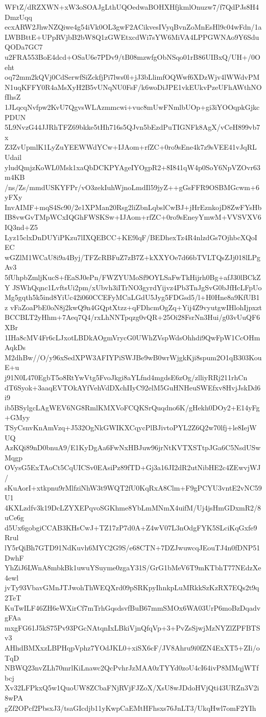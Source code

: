 WFtZ/dRZXWN+xW3oSOAJgLthUQOedwaBOHXHfjkmlOnuzw7/f7QdPJs8H4DmzUqq
ecxARW2JhwNZQiwe4g54iVk0OL3gwF2ACikvesIVyqBvnZoMnEsHl9c04wFdn/1a
LWBBttE+UPpRVjbB2bW8Q1zGWEtxcdWi7sYW6MiVA4LPPGWNAo9Y6SduQODa7GC7
u2FRA553BoE4dcd+OSaU6e7PDv9/tB08mzwfgObNSqo01rB86UIBxQ/UH+/0Oeht
oq72mm2kQVj0CdSerwfSiZckfjPi7lws0l+jJ3bLlimfOQWwf6XDzWjv4lWWdvPM
N1uqKFFY0R4aMsXyH2B5vUNqNU0FsF/k6woDiJPE1vkEUkvPzeUFhAWthNOfIhsZ
1JLqcqNvfpw2KvU7QgvsWLAzmmcwi+vuc8mUwFNmlbUOp+gi3iYOOqpkGjkcPDUN
5L9NvzG44JJRhTFZ69bkke5tHh716s5QJvn5bEzdPuTIGNFk8AgX/vCeH899vb7x
Z3ZvUpmlK1LyZuYEEWWdYCw+IJAom+rfZC+0ro9sEne4k7z9sVEE41vJqRLUdail
yludQmjzKoWL0Msk1xaQbDCKPYAgeIYOgpR2+8I841qW4p0SoY6NpVZOvr63m4KB
/ns/Zs/mmdUSKYFPr/vO3zekIuhWjnoLmdIl59jyZ++gGsFFR9OSBMGcwm+6yFXy
InvAIMF+mqS4Sc90/2e1XPMan20Rsg2liZbnLqbslCwBJ+jHrEznkojD8ZwFYsHb
IB8vwGvTMpWCxIQGhFWSKSw+IJAom+rfZC+0ro9sEneyYmwM+VVSVXV6IQ3nd+Z5
Lyz15clxDnDUYiPKzu7lIXQEBCC+KE9lqF/BEDhexTz4R4nlzdGs7OjhbcXQoIEC
wGZlM1WCaU8i9a4Byj/TFZcRBFuZ7zB7Z+kXXYOe7d66bTVLTQsZJj018lLPgAv3
5fUhpbZmljKucS+fEaSJ0ePn/FWZYUMoSf9OYLSaFwTkHijrh0Bg+afJ30lBCkZY
JSWhQqnc1LvftsUi2pm/xUbvh3iITrNO3gyrdYijvz4Pb3TnJgSvG0bJfHcLFpUo
Mg5gqth5k5ind8YiUc42i060CCEFyMCaLGdU5Jyg5FDGsd5/l+H0Hne8a9KfUB1z
vFaZoaPbE0oN8j2kwQ9n4GQptXtzz+qFDhcmOgZq+Yij4Z9vyutgwIHlohIjpxzt
BCCBLT2yHhm+7Aeq7Q4/rxLhNNTpqzg0vQR+25Oi28FsrNn3Hui/g03vUuQF6XBr
1IHa8cMV4Fr6cLJxotLBDkAOgmVrycG0UWhZVspWdsOhhdi9QwFpW1CcOHmAqkDs
M2dhBw//O/y96xSedXPW3AFIYPiSWJBe9wB0wrWjgkKji8spum2O1qB303KouE+u
j91N0L470EgbT5o8RtYwVtg5FvoJkgi8aYLfnd4mgdsE6zOg/zlliyRRj211rhCn
dT6Syok+3aaqEVTOkAYfVehVdDXchIIyC92elM5GuHNHeuSWEfxv8HvjJskDd6i9
ib5BSylgcLAgWEV6NG8RmlKMXVoFCQKSrQuqdno6K/gHekh0DOy2+E14yFg+GMyy
TSyCsnvKnAmVzq+J532OgNkGWIKXCqycPlBJivtoPYL2Z6Q2w70lfj+le8IejWUQ
AzKQi89nD0bnuA9/E1KyDgAa6FwNxHBJuw96jrNtKVTXSTtpJGa6C5NsdUSwMqgp
OVysG5ExTAoCt5CqUICSv0EAsiPz89fTD+Gj3a16JI2dR2utNibHE2c4ZEwvjWJ/
sKuAorI+xtkpnu9rMlfziNhW3t9WQT2fU0KqRxA8Clm+F9gPCYU3vntE2vNC59U1
4KXLzdfv3k19DcLZYXEPqvoSGKhme8YbLmMNmX4uifM/Uj4jsHmGDxmR2/8uCe6g
d5Ux6gobgiCCAB3KHsCwJ+TZ17zP7d0A+Z4wV07L3nOdgFYK5SLciKqGxfe9Rrul
lY5rQiBh7GTD91NdKuvh6MYC2G9S/e68CTN+7DZJwuwcqJEouTJ4n0fDNP51DwhF
YhZiJ6LWnA8mbkBk1uwuYSuyme0zgaY31S/GrG1bMeV6T9mKTbhT77NEdzXe4ewl
jvTy93VbavGMnJTJwohThWEQXrd09pSRKpyIhnkpLuMRkkSzKzRX7EQs2t9q2TeT
KuTwILF46ZH6eWXirCf7mTrhGqsdsvfBuB67mmSMOx6WA03UrP6moBzDqadvgFAa
mxgFG61J5kS75Pv93PGcNAtqnIxLBkiVjnQfqVp+3+PvZsSjwjMzNYZlZPFBTSv3
AHhdBMXxzLBPHqpVphz7YOdJKL0+xiSX6cF/JV8Ahru9i0fZN4ExXT5+ZIi/oTqD
NBWQ23nvZLh70mrlKiLnawc2QcPvhrJzMAA0zTYYd0zoU4cI64ivP8MMqjWTfbcj
Xv32LFPkxQ5w1QuoUW8ZCbaFNjRVjFJZoX/XsU8wJDdoHVjQti43URZn3V2i8wPA
gZf2OPcf2PbsxJ3/tsaGIcdjb11yKwpCaEMtHFhsxs76JnLT3/UkqHwl7omF2YIh
